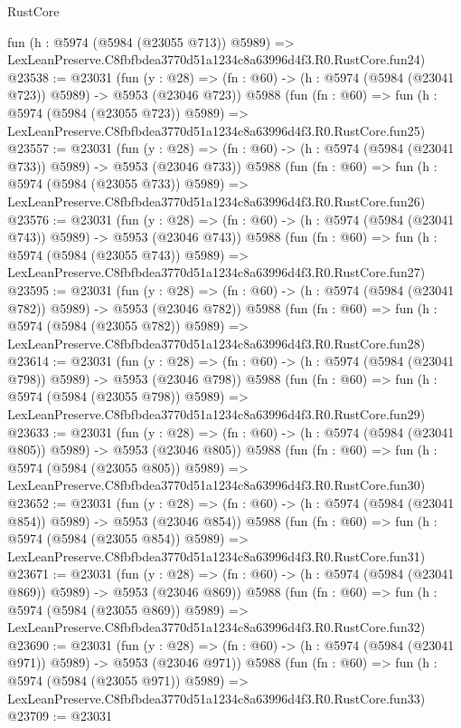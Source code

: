 \begin{lexlean}{RustCore}
\begin{coremodule}
    fun (h : @5974 (@5984 (@23055 @713)) @5989) =>
    LexLeanPreserve.C8fbfbdea3770d51a1234c8a63996d4f3.R0.RustCore.fun24)
@23538 := @23031
    (fun (y : @28) => (fn : @60) -> (h : @5974 (@5984 (@23041 @723)) @5989) -> @5953 (@23046 @723))
    @5988
    (fun (fn : @60) =>
    fun (h : @5974 (@5984 (@23055 @723)) @5989) =>
    LexLeanPreserve.C8fbfbdea3770d51a1234c8a63996d4f3.R0.RustCore.fun25)
@23557 := @23031
    (fun (y : @28) => (fn : @60) -> (h : @5974 (@5984 (@23041 @733)) @5989) -> @5953 (@23046 @733))
    @5988
    (fun (fn : @60) =>
    fun (h : @5974 (@5984 (@23055 @733)) @5989) =>
    LexLeanPreserve.C8fbfbdea3770d51a1234c8a63996d4f3.R0.RustCore.fun26)
@23576 := @23031
    (fun (y : @28) => (fn : @60) -> (h : @5974 (@5984 (@23041 @743)) @5989) -> @5953 (@23046 @743))
    @5988
    (fun (fn : @60) =>
    fun (h : @5974 (@5984 (@23055 @743)) @5989) =>
    LexLeanPreserve.C8fbfbdea3770d51a1234c8a63996d4f3.R0.RustCore.fun27)
@23595 := @23031
    (fun (y : @28) => (fn : @60) -> (h : @5974 (@5984 (@23041 @782)) @5989) -> @5953 (@23046 @782))
    @5988
    (fun (fn : @60) =>
    fun (h : @5974 (@5984 (@23055 @782)) @5989) =>
    LexLeanPreserve.C8fbfbdea3770d51a1234c8a63996d4f3.R0.RustCore.fun28)
@23614 := @23031
    (fun (y : @28) => (fn : @60) -> (h : @5974 (@5984 (@23041 @798)) @5989) -> @5953 (@23046 @798))
    @5988
    (fun (fn : @60) =>
    fun (h : @5974 (@5984 (@23055 @798)) @5989) =>
    LexLeanPreserve.C8fbfbdea3770d51a1234c8a63996d4f3.R0.RustCore.fun29)
@23633 := @23031
    (fun (y : @28) => (fn : @60) -> (h : @5974 (@5984 (@23041 @805)) @5989) -> @5953 (@23046 @805))
    @5988
    (fun (fn : @60) =>
    fun (h : @5974 (@5984 (@23055 @805)) @5989) =>
    LexLeanPreserve.C8fbfbdea3770d51a1234c8a63996d4f3.R0.RustCore.fun30)
@23652 := @23031
    (fun (y : @28) => (fn : @60) -> (h : @5974 (@5984 (@23041 @854)) @5989) -> @5953 (@23046 @854))
    @5988
    (fun (fn : @60) =>
    fun (h : @5974 (@5984 (@23055 @854)) @5989) =>
    LexLeanPreserve.C8fbfbdea3770d51a1234c8a63996d4f3.R0.RustCore.fun31)
@23671 := @23031
    (fun (y : @28) => (fn : @60) -> (h : @5974 (@5984 (@23041 @869)) @5989) -> @5953 (@23046 @869))
    @5988
    (fun (fn : @60) =>
    fun (h : @5974 (@5984 (@23055 @869)) @5989) =>
    LexLeanPreserve.C8fbfbdea3770d51a1234c8a63996d4f3.R0.RustCore.fun32)
@23690 := @23031
    (fun (y : @28) => (fn : @60) -> (h : @5974 (@5984 (@23041 @971)) @5989) -> @5953 (@23046 @971))
    @5988
    (fun (fn : @60) =>
    fun (h : @5974 (@5984 (@23055 @971)) @5989) =>
    LexLeanPreserve.C8fbfbdea3770d51a1234c8a63996d4f3.R0.RustCore.fun33)
@23709 := @23031

\end{coremodule}
\end{lexlean}
